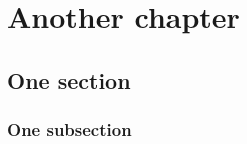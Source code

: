 \chapter{Another chapter}

\lipsum[7]

\section{One section}

\lipsum[3]

\subsection{One subsection}

\lipsum[3]
